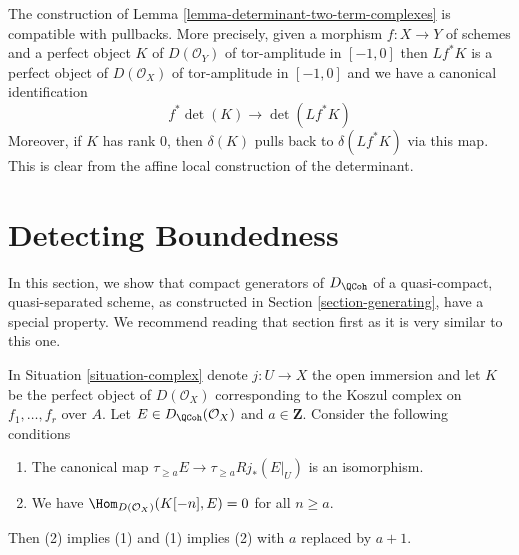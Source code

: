 \begin{remark}
\label{remark-functorial-det}
The construction of Lemma \ref{lemma-determinant-two-term-complexes}
is compatible with pullbacks. More precisely, given a morphism
$f : X \to Y$ of schemes and a perfect object $K$ of $D(\mathcal{O}_Y)$
of tor-amplitude in $[-1, 0]$ then $Lf^*K$ is a
perfect object of $D(\mathcal{O}_X)$
of tor-amplitude in $[-1, 0]$ and we have a canonical identification
$$
f^*\det(K) \longrightarrow \det(Lf^*K)
$$
Moreover, if $K$ has rank $0$, then $\delta(K)$ pulls back to
$\delta(Lf^*K)$ via this map. This is clear from the affine local
construction of the determinant.
\end{remark}






\section{Detecting Boundedness}
\label{section-detecting-boundedness}

\noindent
In this section, we show that compact generators of $D_\QCoh$ of a
quasi-compact, quasi-separated scheme, as constructed in
Section \ref{section-generating}, have a special property.
We recommend reading that section first as it is very similar to this one.

\begin{lemma}
\label{lemma-orthogonal-koszul-first-variant}
In Situation \ref{situation-complex} denote $j : U \to X$ the open
immersion and let $K$ be the perfect object of $D(\mathcal{O}_X)$
corresponding to the Koszul complex on $f_1, \ldots, f_r$ over $A$.
Let $E \in D_\QCoh(\mathcal{O}_X)$ and $a \in \mathbf{Z}$.
Consider the following conditions
\begin{enumerate}
\item The canonical map $\tau_{\geq a}E \to \tau_{\geq a} Rj_*(E|_U)$
is an isomorphism.
\item We have $\Hom_{D(\mathcal{O}_X)}(K[-n], E) = 0$ for all $n \geq a$.
\end{enumerate}
Then (2) implies (1) and (1) implies (2) with $a$ replaced by $a + 1$.
\end{lemma}

